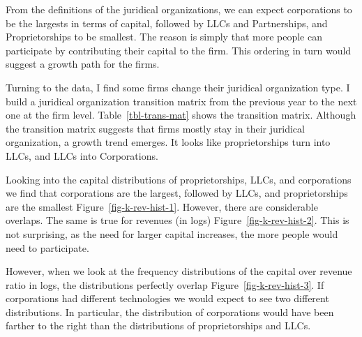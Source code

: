 \documentclass[
  12pt]{article}
\theoremstyle{definition}
\theoremstyle{remark}
\begin{document}
From the definitions of the juridical organizations, we can expect
corporations to be the largests in terms of capital, followed by LLCs
and Partnerships, and Proprietorships to be smallest. The reason is
simply that more people can participate by contributing their capital to
the firm. This ordering in turn would suggest a growth path for the
firms.

Turning to the data, I find some firms change their juridical
organization type. I build a juridical organization transition matrix
from the previous year to the next one at the firm level.
Table~\ref{tbl-trans-mat} shows the transition matrix. Although the
transition matrix suggests that firms mostly stay in their juridical
organization, a growth trend emerges. It looks like proprietorships turn
into LLCs, and LLCs into Corporations.

\begin{table}

\caption{\label{tbl-trans-mat}Transition Matrix}


\end{table}%

Looking into the capital distributions of proprietorships, LLCs, and
corporations we find that corporations are the largest, followed by
LLCs, and proprietorships are the smallest
Figure~\ref{fig-k-rev-hist-1}. However, there are considerable overlaps.
The same is true for revenues (in logs) Figure~\ref{fig-k-rev-hist-2}.
This is not surprising, as the need for larger capital increases, the
more people would need to participate.

However, when we look at the frequency distributions of the capital over
revenue ratio in logs, the distributions perfectly overlap
Figure~\ref{fig-k-rev-hist-3}. If corporations had different
technologies we would expect to see two different distributions. In
particular, the distribution of corporations would have been farther to
the right than the distributions of proprietorships and LLCs.
\end{document}
